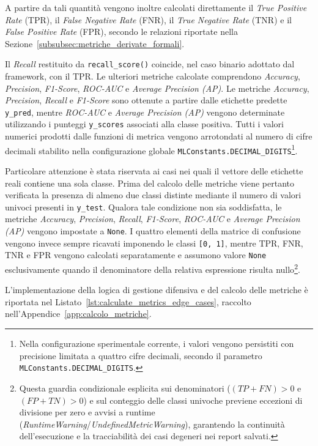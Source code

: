 A partire da tali quantità vengono inoltre calcolati direttamente il \textit{True Positive Rate} (TPR), il \textit{False Negative Rate} (FNR), il \textit{True Negative Rate} (TNR) e il \textit{False Positive Rate} (FPR), secondo le relazioni riportate nella Sezione~\ref{subsubsec:metriche_derivate_formali}.

Il \textit{Recall} restituito da \texttt{recall\_score()} coincide, nel caso binario adottato dal framework, con il TPR. 
Le ulteriori metriche calcolate comprendono \textit{Accuracy}, \textit{Precision}, \textit{F1-Score}, \textit{ROC-AUC} e \textit{Average Precision (AP)}. Le metriche \textit{Accuracy}, \textit{Precision}, \textit{Recall} e \textit{F1-Score} sono ottenute a partire dalle etichette predette \texttt{y\_pred}, mentre \textit{ROC-AUC} e \textit{Average Precision (AP)} vengono determinate utilizzando i punteggi \texttt{y\_scores} associati alla classe positiva. 
Tutti i valori numerici prodotti dalle funzioni di metrica vengono arrotondati al numero di cifre decimali stabilito nella configurazione globale \texttt{MLConstants.DECIMAL\_DIGITS}\footnote{Nella configurazione sperimentale corrente, i valori vengono persistiti con precisione limitata a quattro cifre decimali, secondo il parametro \texttt{MLConstants.DECIMAL\_DIGITS}.}.

Particolare attenzione è stata riservata ai casi nei quali il vettore delle etichette reali contiene una sola classe. 
Prima del calcolo delle metriche viene pertanto verificata la presenza di almeno due classi distinte mediante il numero di valori univoci presenti in \texttt{y\_test}. 
Qualora tale condizione non sia soddisfatta, le metriche \textit{Accuracy}, \textit{Precision}, \textit{Recall}, \textit{F1-Score}, \textit{ROC-AUC} e \textit{Average Precision (AP)} vengono impostate a \texttt{None}. 
I quattro elementi della matrice di confusione vengono invece sempre ricavati imponendo le classi \texttt{[0, 1]}, mentre TPR, FNR, TNR e FPR vengono calcolati separatamente e assumono valore \texttt{None} esclusivamente quando il denominatore della relativa espressione risulta nullo\footnote{Questa guardia condizionale esplicita sui denominatori ($(TP + FN) > 0$ e $(FP + TN) > 0$) e sul conteggio delle classi univoche previene eccezioni di divisione per zero e avvisi a runtime (\textit{RuntimeWarning}/\textit{UndefinedMetricWarning}), garantendo la continuità dell'esecuzione e la tracciabilità dei casi degeneri nei report salvati.}. 

L'implementazione della logica di gestione difensiva e del calcolo delle metriche è riportata nel Listato~\ref{lst:calculate_metrics_edge_cases}, raccolto nell'Appendice~\ref{app:calcolo_metriche}.

